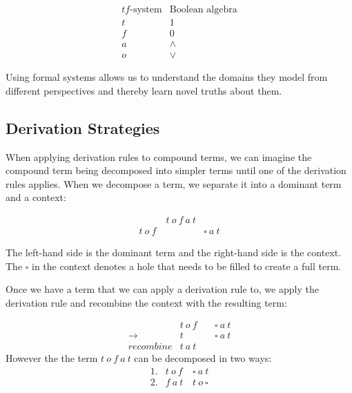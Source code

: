 \[
\begin{array}{cc}
\text{$tf$-system} & \text{Boolean algebra} \\
t & 1 \\
f & 0 \\
a & \wedge \\
o & \vee 
\end{array}
\]

Using formal systems allows us to understand the domains they model from
different perspectives and thereby learn novel truths about them.

\subsection{Derivation Strategies}

When applying derivation rules to compound terms, we can imagine the 
compound term being decomposed into simpler terms until one of the 
derivation rules applies. When we decompose a term, we separate it into a
dominant term and a context:

\begin{figure}[!h]\label{fig:decomposing}
\[
\begin{array}{lcr}
  & t\ o\ f\ a\ t \\
  t\ o\ f\ && \square\ a\ t 
\end{array}
\]
\end{figure}

The left-hand side is the dominant term and the right-hand side is the context. 
The $\square$ in the context denotes a hole that needs to be filled to create a full term.

Once we have a term that we can apply a derivation rule to, 
we apply the derivation rule and recombine the context with the resulting term:

\[
\begin{array}{rlcr}
      & t\ o\ f\ && \square\ a\ t  \\
  \to & t && \square\ a\ t  \\
  \textit{recombine} & t\ a\ t 
\end{array}
\]
However the the term $t\ o\ f\ a\ t$ can be decomposed in two ways:
\[
\begin{array}{rlr}
  1. & t\ o\ f\ & \square\ a\ t  \\
  2. & f\ a\ t & t\ o\ \square  \\
\end{array}
\]

